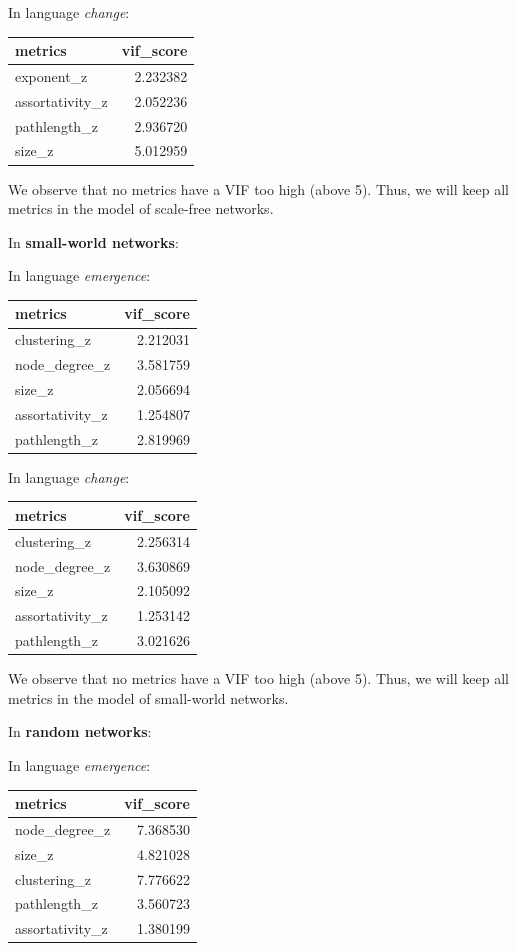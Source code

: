 \documentclass[
]{article}
\begin{document}
In language \emph{change}:

\begin{longtable}[]{@{}lr@{}}
\toprule()
metrics & vif\_score \\
\midrule()
\endhead
exponent\_z & 2.232382 \\
assortativity\_z & 2.052236 \\
pathlength\_z & 2.936720 \\
size\_z & 5.012959 \\
\bottomrule()
\end{longtable}

We observe that no metrics have a VIF too high (above 5). Thus, we will
keep all metrics in the model of scale-free networks.

In \textbf{small-world networks}:

In language \emph{emergence}:

\begin{longtable}[]{@{}lr@{}}
\toprule()
metrics & vif\_score \\
\midrule()
\endhead
clustering\_z & 2.212031 \\
node\_degree\_z & 3.581759 \\
size\_z & 2.056694 \\
assortativity\_z & 1.254807 \\
pathlength\_z & 2.819969 \\
\bottomrule()
\end{longtable}

In language \emph{change}:

\begin{longtable}[]{@{}lr@{}}
\toprule()
metrics & vif\_score \\
\midrule()
\endhead
clustering\_z & 2.256314 \\
node\_degree\_z & 3.630869 \\
size\_z & 2.105092 \\
assortativity\_z & 1.253142 \\
pathlength\_z & 3.021626 \\
\bottomrule()
\end{longtable}

We observe that no metrics have a VIF too high (above 5). Thus, we will
keep all metrics in the model of small-world networks.

In \textbf{random networks}:

In language \emph{emergence}:

\begin{longtable}[]{@{}lr@{}}
\toprule()
metrics & vif\_score \\
\midrule()
\endhead
node\_degree\_z & 7.368530 \\
size\_z & 4.821028 \\
clustering\_z & 7.776622 \\
pathlength\_z & 3.560723 \\
assortativity\_z & 1.380199 \\
\bottomrule()
\end{longtable}
\end{document}
